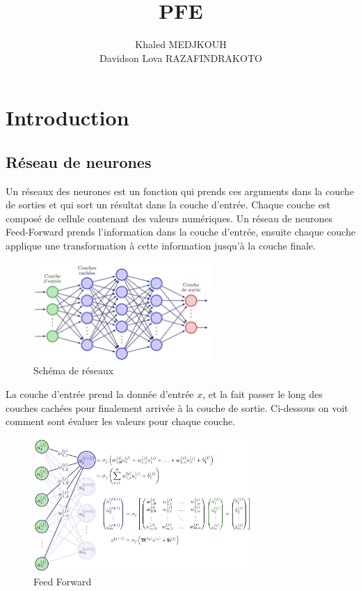 \documentclass[french,12pt]{article}
\title{PFE}
\author{Khaled MEDJKOUH \\ Davidson Lova RAZAFINDRAKOTO}
\begin{document}
\maketitle

\pagebreak

\tableofcontents

\pagebreak

\section{Introduction}



\subsection{Réseau de neurones}

Un réseaux des neurones est un fonction qui prends ces arguments dans la couche de sorties et qui
sort un résultat dans la couche d'entrée. Chaque couche est composé de cellule contenant des valeurs
numériques. Un réseau de neurones Feed-Forward prends l'information dans la couche d'entrée,
ensuite chaque couche applique une transformation à cette information jusqu'à la couche finale.

\begin{figure}[H]
    \centerline{\includegraphics[width = 0.6\textwidth]{FNN/Images/fnn/fnn_page-0001.jpg}}
    \caption{Schéma de réseaux}
    \label{fig:fnn}
\end{figure}

La couche d'entrée prend la donnée d'entrée $x$, et la fait passer le long des couches cachées
pour finalement arrivée à la couche de sortie. Ci-dessous on voit comment sont évaluer les valeurs
pour chaque couche.

\begin{figure}[H]
    \centerline{\includegraphics[width = 0.75\textwidth]{FNN/Images/fnnDetails/fnnDetails_page-0001.jpg}}
    \caption{Feed Forward}
    \label{fig:fnnDetails}
\end{figure}
\end{document}
